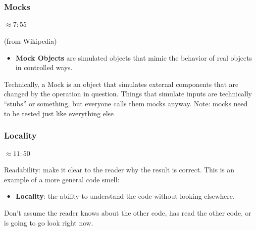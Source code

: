 \begin{frame}[fragile,t]
\frametitle{Mocks}
\framesubtitle{$\approx 7:55$} 
(from Wikipedia)
\begin{itemize}
\item {\bf Mock Objects} are simulated objects that mimic the behavior of real objects in controlled ways. 
\end{itemize}

Technically, a Mock is an object that simulates external components
that are changed by the operation in question.
\vskip 6pt
Things that simulate inputs are technically ``stubs'' or something,
but everyone calls them mocks anyway.
\vskip 6pt
Note: mocks need to be tested just like everything else

\end{frame}

\begin{frame}[fragile,t]
\frametitle{Locality}
\framesubtitle{$\approx 11:50$}
Readability: make it clear to the reader why the result is correct.
\vskip 6pt
This is an example of a more general code smell: 
\vskip 6pt
\begin{itemize}
\item {\bf Locality}: the ability to understand the code without
  looking elsewhere.
\end{itemize}
\vskip 6pt 
Don't assume the reader knows about the other code, has
read the other code, or is going to go look right now.

\vskip 6pt
\begin{center}
\end{center}
\end{frame}


